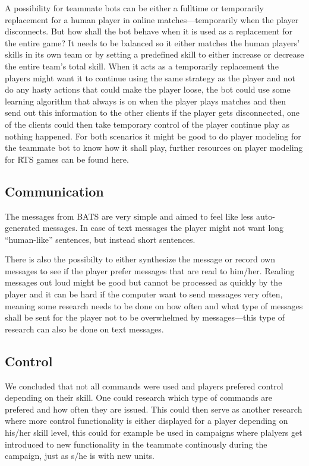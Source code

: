 A possibility for teammate bots can be either a fulltime or temporarily replacement for a human player in online matches—temporarily when the player disconnects. But how shall the bot behave when it is used as a replacement for the entire game? It needs to be balanced so it either matches the human players' skills in its own team or by setting a predefined skill to either increase or decrease the entire team's total skill. When it acts as a temporarily replacement the players might want it to continue using the same strategy as the player and not do any hasty actions that could make the player loose, the bot could use some learning algorithm that always is on when the player plays matches and then send out this information to the other clients if the player gets disconnected, one of the clients could then take temporary control of the player continue play as nothing happened. For both scenarios it might be good to do player modeling for the teammate bot to know how it shall play, further resources on player modeling for RTS games can be found here\cite{bakkes09, jansen07, kabanza10, schadd07, synnaeve11}.

\subsection{Communication}
The messages from BATS are very simple and aimed to feel like less auto-generated messages. In case of text messages the player might not want long ``human-like'' sentences, but instead short sentences.

There is also the possibilty to either synthesize the message or record own messages to see if the player prefer messages that are read to him/her. Reading messages out loud might be good but cannot be processed as quickly by the player and it can be hard if the computer want to send messages very often, meaning some research needs to be done on how often  and what type of messages shall be sent for the player not to be overwhelmed by messages—this type of research can also be done on text messages.

\subsection{Control}
\label{sec:future_control}
We concluded that not all commands were used and players prefered control depending on their skill. One could research which type of commands are prefered and how often they are issued. This could then serve as another research where more control functionality is either displayed for a player depending on his/her skill level, this could for example be used in campaigns where plalyers get introduced to new functionality in the teammate continously during the campaign, just as s/he is with new units.

